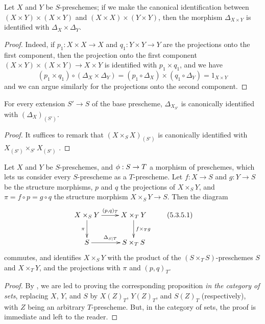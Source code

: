 \begin{prop}[5.3.2]
\label{1.5.3.2}
Let $X$ and $Y$ be $S$-preschemes;
if we make the canonical identification between $(X\times Y)\times(X\times Y)$ and $(X\times X)\times(Y\times Y)$, then the morphism $\Delta_{X\times Y}$ is identified with $\Delta_X\times\Delta_Y$.
\end{prop}

\begin{proof}
\label{proof-1.5.3.2}
Indeed, if $p_1:X\times X\to X$ and $q_1:Y\times Y\to Y$ are the projections onto the first component, then the projection onto the first component $(X\times Y)\times(X\times Y)\to X\times Y$ is identified with $p_1\times q_1$, and we have
\[
    (p_1\times q_1)\circ(\Delta_X\times\Delta_Y)=(p_1\circ\Delta_X)\times(q_1\circ\Delta_Y)=1_{X\times Y}
\]
and we can argue similarly for the projections onto the second component.
\end{proof}

\begin{cor}[5.3.4]
\label{1.5.3.4}
For every extension $S'\to S$ of the base prescheme, $\Delta_{X_{S'}}$ is canonically identified with $(\Delta_X)_{(S')}$.
\end{cor}

\begin{proof}
\label{proof-1.5.3.4}
It suffices to remark that $(X\times_S X)_{(S')}$ is canonically identified with $X_{(S')}\times_{S'}X_{(S')}$ .
\end{proof}

\begin{prop}[5.3.5]
\label{1.5.3.5}
Let $X$ and $Y$ be $S$-preschemes, and $\vphi:S\to T$ a morphism of preschemes, which lets us consider every $S$-prescheme as a $T$-prescheme.
Let $f:X\to S$ and $g:Y\to S$ be the structure morphisms, $p$ and $q$ the projections of $X\times_S Y$, and $\pi=f\circ p=g\circ q$ the structure morphism $X\times_S Y\to S$.
Then the diagram
\[
  \xymatrix{
    X\times_S Y\ar[r]^{(p,q)_T}\ar[d]_\pi &
    X\times_T Y\ar[d]^{f\times_T g}\\
    S\ar[r]^{\Delta_{S|T}} &
    S\times_T S
  }
  \tag{5.3.5.1}
\]
commutes, and identifies $X\times_S Y$ with the product of the $(S\times_T S)$-preschemes $S$ and $X\times_T Y$, and the projections with $\pi$ and $(p,q)_T$.
\end{prop}

\begin{proof}
\label{proof-1.5.3.5}
By , we are led to proving the corresponding proposition \emph{in the category of sets}, replacing $X$, $Y$, and $S$ by $X(Z)_T$, $Y(Z)_T$, and $S(Z)_T$ (respectively), with $Z$ being an arbitrary $T$-prescheme.
But, in the category of sets, the proof is immediate and left to the reader.
\end{proof}

